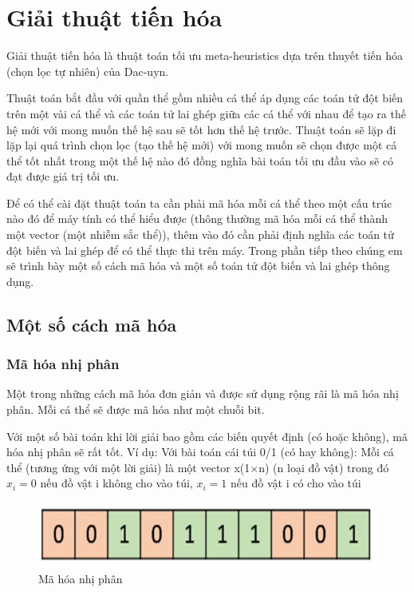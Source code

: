 \documentclass[a4paper,12pt]{report}
\begin{document}
\section{Giải thuật tiến hóa}
Giải thuật tiến hóa là thuật toán tối ưu meta-heuristics dựa trên thuyết tiến hóa (chọn lọc tự nhiên) của Dac-uyn.
\par Thuật toán bắt đầu với quần thể gồm nhiều cá thể áp dụng các toán tử đột biến trên một vài cá thể và các toán tử lai ghép giữa các cá thể với nhau để tạo ra thế hệ mới với mong muốn thế hệ sau sẽ tốt hơn thế hệ trước. Thuật toán sẽ lặp đi lặp lại quá trình chọn lọc (tạo thế hệ mới) với mong muốn sẽ chọn được một cá thể tốt nhất trong một thế hệ nào đó đồng nghĩa bài toán tối ưu đầu vào sẽ có đạt được giá trị tối ưu.
\par Để có thể cài đặt thuật toán ta cần phải mã hóa mỗi cá thể theo một cấu trúc nào đó để máy tính có thể hiểu được (thông thường mã hóa mỗi cá thể thành một vector (một nhiễm sắc thể)), thêm vào đó cần phải định nghĩa các toán tử đột biến và lai ghép để có thể thực thi trên máy. Trong phần tiếp theo chúng em sẽ trình bày một số cách mã hóa và một số toán tử đột biến và lai ghép thông dụng.

\subsection{Một số cách mã hóa}\label{sub_encode}
\subsubsection{Mã hóa nhị phân}
Một trong những cách mã hóa đơn giản và được sử dụng rộng rãi là mã hóa nhị phân. Mỗi cá thể sẽ được mã hóa như một chuỗi bit.
\par Với một số bài toán khi lời giải bao gồm các biến quyết định (có hoặc không), mã hóa nhị phân sẽ rất tốt. Ví dụ: Với bài toán cái túi 0/1 (có hay không): Mỗi cá thể (tương ứng với một lời giải) là một vector x(1$\times$n) (n loại đồ vật) trong đó $x_i=0$ nếu đồ vật i không cho vào túi, $x_i=1$ nếu đồ vật i có cho vào túi
\begin{figure}[H]
\centering 
\includegraphics[scale=0.6]{binary_representation.PNG}
\caption{Mã hóa nhị phân}
\end{figure}  
\end{document}
